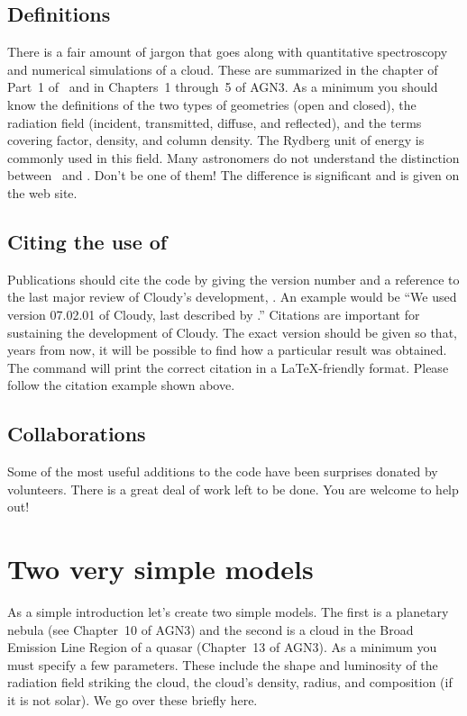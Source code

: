 \documentclass[12pt,twoside]{article}
\begin{document}
\subsection{Definitions}

There is a fair amount of jargon that goes along with quantitative
spectroscopy and numerical simulations of a cloud.  These are summarized
in the chapter  of Part~1 of \Hazy\ and in Chapters~1 through~5
of AGN3.  As a minimum you should know the definitions of the two types of
geometries (open and closed), the radiation field (incident, transmitted, diffuse,
and reflected), and the terms covering factor, density, and column density.
The Rydberg unit of energy is commonly used in this field.
Many astronomers do not understand the distinction between
\hO\ and \hi .
Don't be one of them!  The difference is significant and is given
on the web site.

\subsection{Citing the use of \Cloudy}

Publications should cite the code by giving the version number and a
reference to the last major review of Cloudy's development,
\citet{CloudyReview}.
An example would be ``We used version 07.02.01 of Cloudy, last
described by \citet{CloudyReview}.''
Citations are important for sustaining the development of Cloudy.
The exact version should be given so that, years
from now, it will be possible to find how a particular result was obtained.
The command  will print the correct citation in a
\LaTeX-friendly format.
Please follow the citation example shown above.

\subsection{Collaborations}

Some of the most useful additions to the code have been surprises donated
by volunteers.  There is a great deal of work left to be done.  You are
welcome to help out!

\section{Two very simple models}
\label{sec:TwoVerySimpleModels}

As a simple introduction let's create two simple models.  The first is
a planetary nebula (see Chapter~10 of AGN3) and the second is a cloud in
the Broad Emission Line Region of a quasar (Chapter~13 of AGN3).  As a
minimum you must specify a few parameters.
These include the shape and luminosity of the radiation field
striking the cloud, the cloud's density, radius,
and composition (if it is not solar).
We go over these briefly here.
\end{document}
